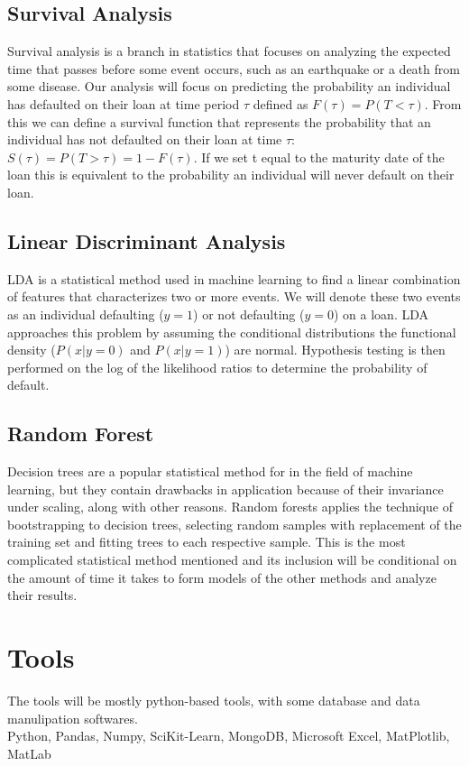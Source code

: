 \documentclass[sigconf, 11pt]{acmart}
\begin{document}
\subsection{Survival Analysis}
Survival analysis is a branch in statistics that focuses on analyzing the expected time that passes before some event occurs, such as an earthquake or a death from some disease. Our analysis will focus on predicting the probability an individual has defaulted on their loan at time period $\tau$ defined as $F(\tau) = P(T<\tau)$. From this we can define a survival function that represents the probability that an individual has not defaulted on their loan at time $\tau$: $S(\tau) = P(T>\tau) = 1-F(\tau)$. If we set t equal to the maturity date of the loan this is equivalent to the probability an individual will never default on their loan.
\subsection{Linear Discriminant Analysis}
LDA is a statistical method used in machine learning to find a linear combination of features that characterizes two or more events. We will denote these two events as an individual defaulting ($y=1$) or not defaulting ($y=0$) on a loan. LDA approaches this problem by assuming the conditional distributions the functional density ($P(x|y=0)$ and $P(x|y=1)$) are normal. Hypothesis testing is then performed on the log of the likelihood ratios to determine the probability of default.
\subsection{Random Forest}
Decision trees are a popular statistical method for in the field of machine learning, but they contain drawbacks in application because of their invariance under scaling, along with other reasons. Random forests applies the technique of bootstrapping to decision trees, selecting random samples with replacement of the training set and fitting trees to each respective sample. This is the most complicated statistical method mentioned and its inclusion will be conditional on the amount of time it takes to form models of the other methods and analyze their results.


\newpage
\section{Tools}
The tools will be mostly python-based tools, with some database and data manulipation softwares. \\
Python, Pandas, Numpy, SciKit-Learn, MongoDB, 
Microsoft Excel, MatPlotlib, MatLab \\
\end{document}
